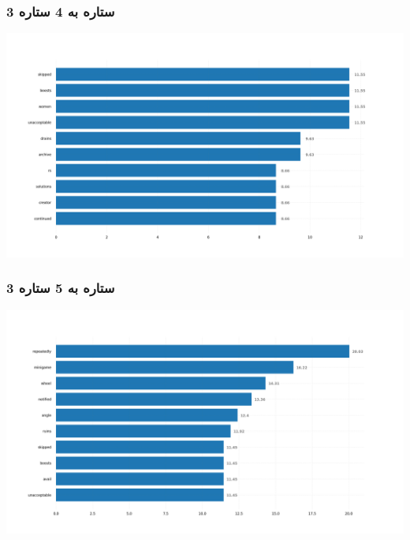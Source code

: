 \subsubsection{\Large 3 ستاره به 4 ستاره}
            { \selectfont \setLR
            \begin{center}
            \includegraphics[scale=0.4]{Images/rel_norm_freq_3_4.png}
            \end{center}
            \begin{adjustbox}{width=\textwidth}
            \end{adjustbox}
            }
\subsubsection{\Large 3 ستاره به 5 ستاره}
            { \selectfont \setLR
            \begin{center}
            \includegraphics[scale=0.4]{Images/rel_norm_freq_3_5.png}
            \end{center}
            \begin{adjustbox}{width=\textwidth}
            \end{adjustbox}
            }
